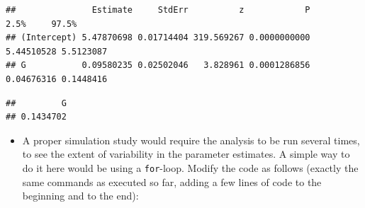 \documentclass[
]{book}
\newenvironment{Shaded}{\begin{snugshade}}{\end{snugshade}}
\newcommand{\AttributeTok}[1]{\textcolor[rgb]{0.13,0.29,0.53}{#1}}
\newcommand{\CommentTok}[1]{\textcolor[rgb]{0.56,0.35,0.01}{\textit{#1}}}
\newcommand{\DecValTok}[1]{\textcolor[rgb]{0.00,0.00,0.81}{#1}}
\newcommand{\FunctionTok}[1]{\textcolor[rgb]{0.13,0.29,0.53}{\textbf{#1}}}
\newcommand{\NormalTok}[1]{#1}
\newcommand{\OtherTok}[1]{\textcolor[rgb]{0.56,0.35,0.01}{#1}}
\newcommand{\SpecialCharTok}[1]{\textcolor[rgb]{0.81,0.36,0.00}{\textbf{#1}}}
\providecommand{\tightlist}{%
  \setlength{\itemsep}{0pt}\setlength{\parskip}{0pt}}
\theoremstyle{definition}
\theoremstyle{definition}
\theoremstyle{definition}
\theoremstyle{definition}
\theoremstyle{remark}
\begin{document}
\begin{Shaded}
\end{Shaded}

\begin{verbatim}
##               Estimate     StdErr          z            P       2.5%     97.5%
## (Intercept) 5.47870698 0.01714404 319.569267 0.0000000000 5.44510528 5.5123087
## G           0.09580235 0.02502046   3.828961 0.0001286856 0.04676316 0.1448416
\end{verbatim}

\begin{Shaded}
\end{Shaded}

\begin{verbatim}
##         G 
## 0.1434702
\end{verbatim}

\begin{itemize}
\tightlist
\item
  A proper simulation study would require the analysis to be run several times, to see the extent of variability in the parameter estimates. A simple way to do it here would be using a \texttt{for}-loop. Modify the code as follows (exactly the same commands as executed so far, adding a few lines of code to the beginning and to the end):
\end{itemize}
\end{document}
